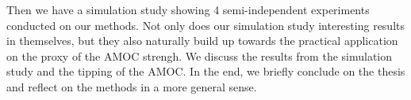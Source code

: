 Then we have a simulation study showing 4 semi-independent experiments conducted on our methods. Not only does our simulation study interesting results in themselves, but they also naturally build up towards the practical application on the proxy of the AMOC strengh. We discuss the results from the simulation study and the tipping of the AMOC. In the end, we briefly conclude on the thesis and reflect on the methods in a more general sense. 